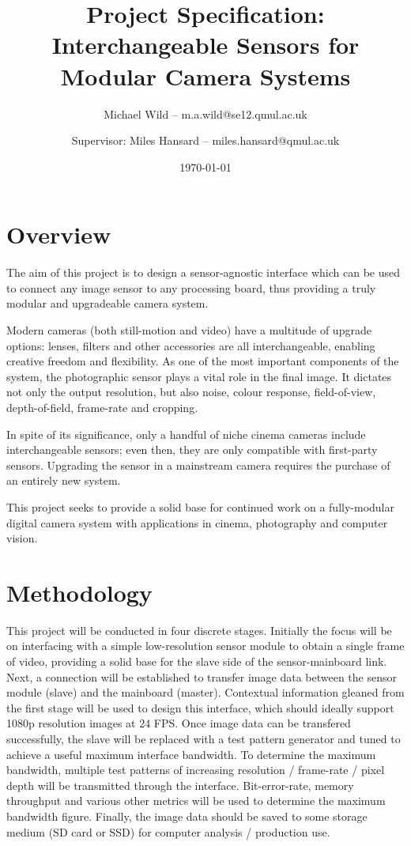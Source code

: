 \documentclass[a4paper]{article}
\title{Project Specification: Interchangeable Sensors for Modular Camera Systems}
\author{Michael Wild – m.a.wild@se12.qmul.ac.uk \and Supervisor: Miles Hansard – miles.hansard@qmul.ac.uk}
\date{\today}
\begin{document}
\maketitle

\section{Overview}

The aim of this project is to design a sensor-agnostic interface which can be used to connect any image sensor to any processing board, thus providing a truly modular and upgradeable camera system.

Modern cameras (both still-motion and video) have a multitude of upgrade options: lenses, filters and other accessories are all interchangeable, enabling creative freedom and flexibility. As one of the most important components of the system, the photographic sensor plays a vital role in the final image. It dictates not only the output resolution, but also noise, colour response, field-of-view, depth-of-field, frame-rate and cropping. 

In spite of its significance, only a handful of niche cinema cameras include interchangeable sensors; even then, they are only compatible with first-party sensors. Upgrading the sensor in a mainstream camera requires the purchase of an entirely new system.

This project seeks to provide a solid base for continued work on a fully-modular digital camera system with applications in cinema, photography and computer vision.

\section{Methodology}

This project will be conducted in four discrete stages. Initially the focus will be on interfacing with a simple low-resolution sensor module to obtain a single frame of video, providing a solid base for the slave side of the sensor-mainboard link. Next, a connection will be established to transfer image data between the sensor module (slave) and the mainboard (master). Contextual information gleaned from the first stage will be used to design this interface, which should ideally support 1080p resolution images at 24 FPS. Once image data can be transfered successfully, the slave will be replaced with a test pattern generator and tuned to achieve a useful maximum interface bandwidth. To determine the maximum bandwidth, multiple test patterns of increasing resolution / frame-rate / pixel depth will be transmitted through the interface. Bit-error-rate, memory throughput and various other metrics will be used to determine the maximum bandwidth figure. Finally, the image data should be saved to some storage medium (SD card or SSD) for computer analysis / production use.
\end{document}
